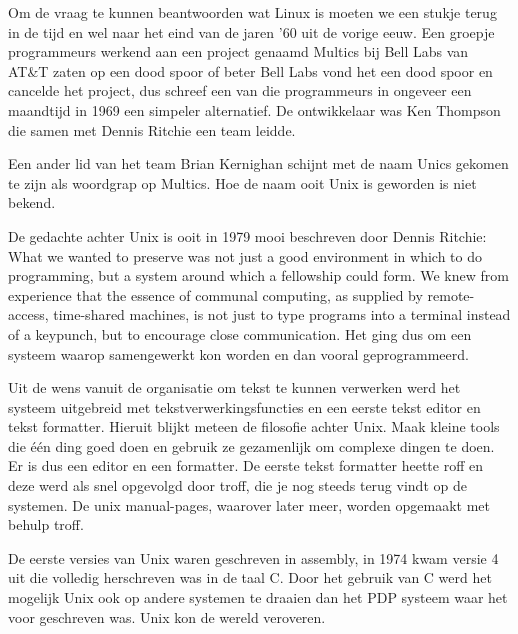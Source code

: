 Om de vraag te kunnen beantwoorden wat Linux is moeten we een stukje terug in de tijd en wel naar het eind van de jaren '60 uit de vorige eeuw. Een groepje programmeurs werkend aan een project genaamd Multics bij Bell Labs van AT\&T zaten op een dood spoor of beter Bell Labs vond het een dood spoor en cancelde het project, dus schreef een van die programmeurs in ongeveer een maandtijd in 1969 een simpeler alternatief. De ontwikkelaar was Ken Thompson die samen met Dennis Ritchie een team leidde.\par

Een ander lid van het team Brian Kernighan schijnt met de naam Unics gekomen te zijn als woordgrap op Multics. Hoe de naam ooit Unix is geworden is niet bekend.\par

De gedachte achter Unix is ooit in 1979 mooi beschreven door Dennis Ritchie:
What we wanted to preserve was not just a good environment in which to do programming, but a system around which a fellowship could form. We knew from experience that the essence of communal computing, as supplied by remote-access, time-shared machines, is not just to type programs into a terminal instead of a keypunch, but to encourage close communication.
Het ging dus om een systeem waarop samengewerkt kon worden en dan vooral geprogrammeerd.\par

Uit de wens vanuit de organisatie om tekst te kunnen verwerken werd het systeem uitgebreid met tekstverwerkingsfuncties
en een eerste tekst editor en tekst formatter. Hieruit blijkt meteen de filosofie achter Unix. Maak kleine tools die
\'e\'en ding goed doen en gebruik ze gezamenlijk om complexe dingen te doen. Er is dus een editor en een formatter. De
eerste tekst formatter heette roff en deze werd als snel opgevolgd door troff, die je nog steeds terug vindt op de
systemen. De unix manual-pages, waarover later meer, worden opgemaakt met behulp troff.\par

De eerste versies van Unix waren geschreven in assembly, in 1974 kwam versie 4 uit die volledig herschreven was in de
taal C. Door het gebruik van C werd het mogelijk Unix ook op andere systemen te draaien dan het PDP systeem
waar het voor geschreven was. Unix kon de wereld veroveren.\par

